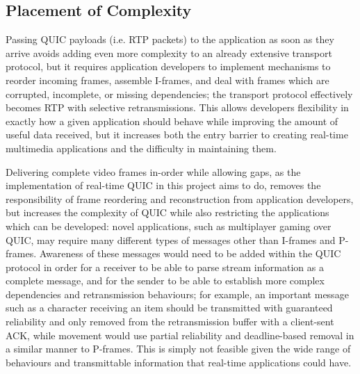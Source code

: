 \documentclass{mpaper}
\begin{document}
\subsection{Placement of Complexity}
Passing QUIC payloads (i.e. RTP packets) to the application as soon as they arrive avoids adding even more complexity to an already extensive transport protocol, but it requires application developers to implement mechanisms to reorder incoming frames, assemble I-frames, and deal with frames which are corrupted, incomplete, or missing dependencies; the transport protocol effectively becomes RTP with selective retransmissions. This allows developers flexibility in exactly how a given application should behave while improving the amount of useful data received, but it increases both the entry barrier to creating real-time multimedia applications and the difficulty in maintaining them.


Delivering complete video frames in-order while allowing gaps, as the implementation of real-time QUIC in this project aims to do, removes the responsibility of frame reordering and reconstruction from application developers, but increases the complexity of QUIC while also restricting the applications which can be developed: novel applications, such as multiplayer gaming over QUIC, may require many different types of messages other than I-frames and P-frames. Awareness of these messages would need to be added within the QUIC protocol in order for a receiver to be able to parse stream information as a complete message, and for the sender to be able to establish more complex dependencies and retransmission behaviours; for example, an important message such as a character receiving an item should be transmitted with guaranteed reliability and only removed from the retransmission buffer with a client-sent ACK, while movement would use partial reliability and deadline-based removal in a similar manner to P-frames. This is simply not feasible given the wide range of behaviours and transmittable information that real-time applications could have.
\end{document}
